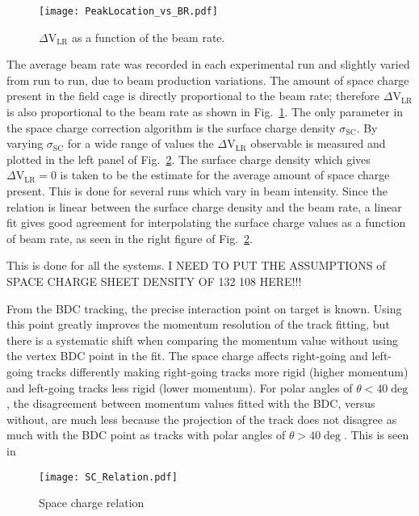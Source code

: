 \begin{figure}[H]
\texttt{[image: PeakLocation\_vs\_BR.pdf]}
\caption{$\Delta\mathrm{V}_\mathrm{LR}$ as a function of the beam rate. }
\label{fig:spacechg_br}
\end{figure}

The average beam rate was recorded in each experimental run and slightly varied from run to run, due to beam production variations. The amount of space charge present in the field cage is directly proportional to the beam rate; therefore $\Delta\mathrm{V}_\mathrm{LR}$ is also proportional to the beam rate as shown in Fig.~\ref{fig:spacechg_br}. The only parameter in the space charge correction algorithm is the surface charge density $\sigma_{\mathrm{SC}}$. By varying $\sigma_{\mathrm{SC}}$ for a wide range of values the $\Delta\mathrm{V}_\mathrm{LR}$ observable is measured and plotted in the left panel of Fig.~\ref{fig:spacechg_relation}. The surface charge density which gives $\Delta\mathrm{V}_\mathrm{LR} = 0$ is taken to be the estimate for the average amount of space charge present. This is done for several runs which vary in beam intensity. Since the relation is linear between the surface charge density and the beam rate, a linear fit gives good agreement for interpolating the surface charge values as a function of beam rate, as seen in the right figure of Fig.~\ref{fig:spacechg_relation}.

This is done for all the systems. I NEED TO PUT THE ASSUMPTIONS of SPACE CHARGE SHEET DENSITY OF 132 108 HERE!!!

From the BDC tracking, the precise interaction point on target is known. Using this point greatly improves the momentum resolution of the track fitting, but there is a systematic shift when comparing the momentum value without using the vertex BDC point in the fit. The space charge affects right-going and left-going tracks differently making right-going tracks more rigid (higher momentum) and left-going tracks less rigid (lower momentum). For polar angles of $\theta < 40 \deg$, the disagreement between momentum values fitted with the BDC, versus without, are much less because the projection of the track does not disagree as much with the BDC point as tracks with polar angles of $\theta > 40 \deg$. This is seen in 


\begin{figure}[H]
\texttt{[image: SC\_Relation.pdf]}
\caption{Space charge relation}
\label{fig:spacechg_relation}
\end{figure}


